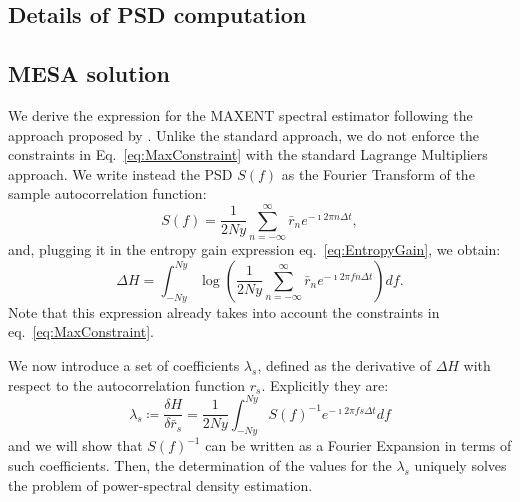 \documentclass[epj,nopacs]{svjour}
\begin{document}



\begin{appendix}
\section{Details of PSD computation} \label{sec:appendix}
\subsection{MESA solution}\label{sec:MESA_solution}
We derive the expression for the MAXENT spectral estimator following the approach proposed by \cite{burg1975maximum}.
Unlike the standard approach, we do not enforce the constraints in Eq.~\eqref{eq:MaxConstraint} with the standard Lagrange Multipliers approach.
We write instead the PSD $S(f)$ as the Fourier Transform of the sample autocorrelation function: 
\begin{equation}
    S(f) = \frac{1}{2 Ny}\sum_{n = -\infty}^{\infty} \bar r_n e^{- \imath 2 \pi n \Delta t},
\end{equation}
and, plugging it in the entropy gain expression eq.~\eqref{eq:EntropyGain}, we obtain:
\begin{equation}
    \Delta H = \int_{-Ny}^{Ny}  
    \log\left(\frac{1}{2 Ny}\sum_{n = -\infty}^{\infty} \bar r_n e^{-\imath 2 \pi f n \Delta t} 
    \right) df.
\end{equation}
Note that this expression already takes into account the constraints in eq.~\eqref{eq:MaxConstraint}.

We now introduce a set of coefficients $\lambda_s$, defined as the derivative of $\Delta H$ with respect to the autocorrelation function $r_s$.
Explicitly they are:
\begin{equation} \label{eq:lamdas}
      \lambda_s \coloneqq \frac{\delta H}{\delta \bar r_s} = \frac{1}{2Ny}\int_{-Ny}^{Ny} S(f)^{-1}e^{-\imath 2 \pi f s \Delta t } df
\end{equation} 
and we will show that $S(f)^{-1}$ can be written as a Fourier Expansion in terms of such coefficients. Then, the determination of the values for the $\lambda_s$ uniquely solves the problem of power-spectral density estimation.


\end{appendix}
\end{document}
